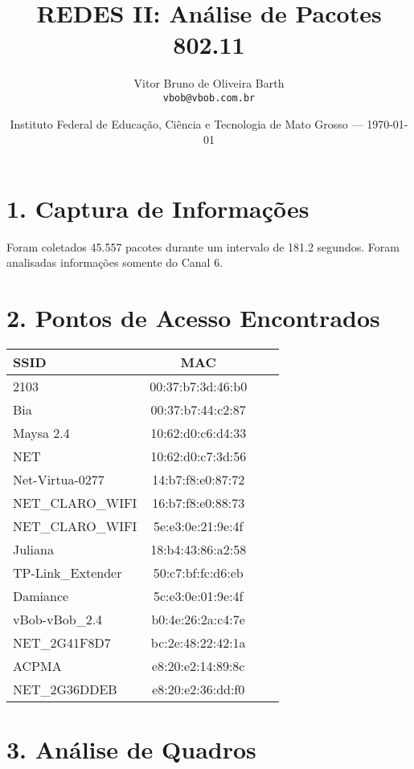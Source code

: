 \documentclass{article}
\title{REDES II: Análise de Pacotes 802.11} %
\author{Vitor Bruno de Oliveira Barth\\ \texttt{vbob@vbob.com.br}} %
\date{Instituto Federal de Educação, Ciência e Tecnologia de Mato Grosso --- \today} %
\begin{document}
\maketitle %

\section*{1. Captura de Informações}

\par Foram coletados 45.557 pacotes durante um intervalo de 181.2 segundos. Foram analisadas informações somente do Canal 6.

\section*{2. Pontos de Acesso Encontrados}

\begin{tabular}{l*{2}{c}r}
  SSID               & MAC                 \\
  \hline
  2103               & 00:37:b7:3d:46:b0   \\
  Bia                & 00:37:b7:44:c2:87	 \\
  Maysa 2.4          & 10:62:d0:c6:d4:33   \\
  NET                & 10:62:d0:c7:3d:56   \\
  Net-Virtua-0277    & 14:b7:f8:e0:87:72   \\
  NET\_CLARO\_WIFI   & 16:b7:f8:e0:88:73   \\
  NET\_CLARO\_WIFI   & 5e:e3:0e:21:9e:4f   \\
  Juliana            & 18:b4:43:86:a2:58   \\
  TP-Link\_Extender   & 50:c7:bf:fc:d6:eb   \\
  Damiance           & 5c:e3:0e:01:9e:4f	 \\
  vBob-vBob\_2.4     & b0:4e:26:2a:c4:7e   \\
  NET\_2G41F8D7      & bc:2e:48:22:42:1a	 \\
  ACPMA              & e8:20:e2:14:89:8c   \\
  NET\_2G36DDEB      & e8:20:e2:36:dd:f0	 \\
\end{tabular}

\section*{3. Análise de Quadros}
\end{document}
